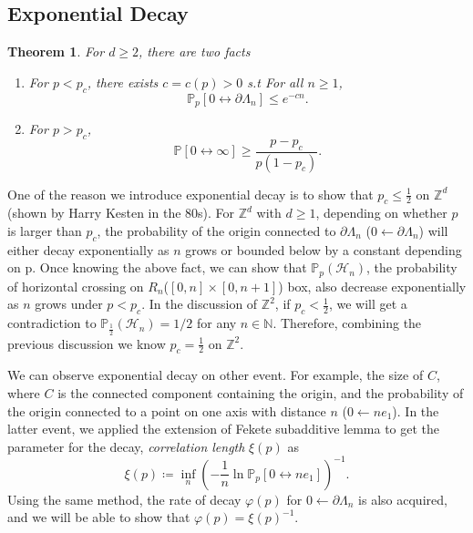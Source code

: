 \documentclass[12pt]{article}
\theoremstyle{plane}
\newtheorem*{thm}{Theorem}
\theoremstyle{definition}
\begin{document}
\subsection{Exponential Decay}\label{Course_Progress:Exponentia_Decay}
\begin{thm} For $d \geq 2$, there are two facts
\begin{enumerate}
	    \item For $p < p_c$, there exists $c = c(p) > 0$ s.t For all $n\geq 1$,
				$$
					\mathbb{P}_p[0 \longleftrightarrow \partial \Lambda_n] \leq e^{-cn}.	
				$$
		\item For $p > p_c$,
			$$
			\mathbb{P}[0\longleftrightarrow \infty ]\geq \frac{p-p_c}{p(1-p_c)}.
			$$
\end{enumerate}
\end{thm}
One of the reason we introduce exponential decay is to show that $p_c \leq \frac{1}{2}$ on $\mathbb{Z}^d$(shown by Harry Kesten in the 80s). 
For $\mathbb{Z}^d$ with $d\geq 1$, depending on whether $p$ is larger than $p_c$, the probability of the origin connected to $\partial \Lambda_n$  ($0 \longleftarrow \partial \Lambda_n$) will either decay exponentially as $n$ grows or bounded below by a constant depending on p. 
Once knowing the above fact, we can show that $\mathbb{P}_p (\mathcal{H}_n)$, the probability of horizontal crossing on $R_n$($[0,n]\times [0,n+1]$) box, also decrease exponentially as $n$ grows under $p < p_c$. 
In the discussion of $\mathbb{Z}^2$, if $p_c < \frac{1}{2}$, we will get a contradiction to $\mathbb{P}_{\frac{1}{2}}(\mathcal{H}_n) = 1/2$ for any $n \in \mathbb{N}$. Therefore, combining the previous discussion we know $p_c = \frac{1}{2}$ on $\mathbb{Z}^2$.

We can observe exponential decay on other event. For example, the size of $C$, where $C$ is the connected component containing the origin, and the probability of the origin connected to a point on one axis with distance $n$ ($0 \longleftarrow ne_1$). In the latter event, we applied the extension of Fekete subadditive lemma to get the parameter for the decay, \textit{correlation length} $\xi(p)$ as 
$$
\xi(p) \coloneqq \inf_{n} \left(-\frac{1}{n}\ln{\mathbb{P}_p[0 \leftrightarrow ne_1]}\right)^{-1}.
$$
Using the same method, the rate of decay $\varphi(p)$ for $0 \longleftarrow \partial \Lambda_n$ is also acquired, and we will be able to show that $\varphi(p) = \xi(p)^{-1}$.

\end{document}
